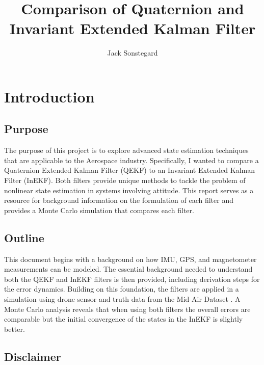 \title{Comparison of Quaternion and Invariant Extended Kalman Filter}
\author{Jack Sonstegard}

\maketitle

\section{Introduction}
\subsection{Purpose}

The purpose of this project is to explore advanced state estimation techniques that are applicable to the Aerospace industry. Specifically, I wanted to compare a Quaternion Extended Kalman Filter (QEKF) to an Invariant Extended Kalman Filter (InEKF). Both filters provide unique methods to tackle the problem of nonlinear state estimation in systems involving attitude. This report serves as a resource for background information on the formulation of each filter and provides a Monte Carlo simulation that compares each filter.

\subsection{Outline}

This document begins with a background on how IMU, GPS, and magnetometer measurements can be modeled. The essential background needed to understand both the QEKF and InEKF filters is then provided, including derivation steps for the error dynamics. Building on this foundation, the filters are applied in a simulation using drone sensor and truth data from the Mid-Air Dataset \cite{Fonder2019MidAir}. A Monte Carlo analysis reveals that when using both filters the overall errors are comparable but the initial convergence of the states in the InEKF is slightly better.

\subsection{Disclaimer}

